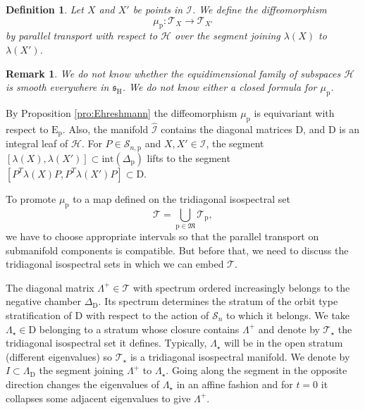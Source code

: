 \documentclass[reqno]{amsart}
\newcommand{\p}{\mathrm{p}}
\newcommand{\D}{\mathrm{D}}
\renewcommand{\ss}{\mathfrak{s}}
\newcommand{\cH}{\mathcal{H}}
\newcommand{\cI}{\mathcal{I}}
\newcommand{\cS}{\mathcal{S}}
\newcommand{\cT}{\mathcal{T}}
\newcommand{\E}{\mathrm{E}}
\renewcommand{\H}{\mathrm{H}}
\newtheorem{definition}[theorem]{Definition}
\newtheorem{remark}[theorem]{Remark}
\begin{document}
\begin{definition}\label{def:parallel-transport} Let $X$ and $X'$ be points in $\cI$. We define the diffeomorphism
 \begin{equation}\label{eq:parallel-transport}
  \mu_\p:\cT_X\to \cT_{X'}
 \end{equation}
by parallel transport with respect to $\cH$ over the segment joining $\lambda(X)$ to $\lambda(X')$.
\end{definition}
\begin{remark}\label{rem:Ehreshman2}
We do not know whether the equidimensional family of subspaces $\cH$ is smooth everywhere in $\ss_\H$. We do not know either a closed formula for $\mu_\p$.
\end{remark}

 By Proposition \ref{pro:Ehreshmann} the diffeomorphism $\mu_\p$ is equivariant with respect to $\E_{\p}$. Also, the manifold $\widehat{\cI}$ contains the diagonal matrices $\D$, and $\D$ is an integral leaf of $\cH$.  For $P\in \cS_{n,\p}$ and $X,X'\in \cI$,  the segment
 $[\lambda(X),\lambda(X')]\subset \mathrm{int}(\Delta_{\p})$ lifts to the segment $[P^T\lambda(X)P,P^T\lambda(X')P]\subset \D$.

To promote $\mu_\p$ to a map defined on the tridiagonal isospectral set
\[\cT=\bigcup_{\p\in \mathfrak{M}}\cT_\p,\]
we have to choose appropriate intervals so that the parallel transport on submanifold components is compatible.
But before that, we need to discuss   the tridiagonal isospectral sets in which we can embed $\cT$.

The diagonal matrix $\Lambda^+\in \cT$ with spectrum ordered increasingly belongs to the negative chamber $\Delta_\D$. Its spectrum determines the stratum of the orbit type stratification of $\D$ with respect to the action of $\cS_n$ to which it belongs. We take $\Lambda_\star\in \D$ belonging to a stratum whose closure contains $\Lambda^+$ and denote by $\cT_\star$ the tridiagonal isospectral set it defines. Typically, $\Lambda_\star$ will be in the open stratum (different eigenvalues) so $\cT_\star$ is a tridiagonal isospectral manifold. We denote by $I\subset \Lambda_\D$ the segment joining $\Lambda^+$ to $\Lambda_\star$. Going along the segment in the opposite direction changes the eigenvalues of $\Lambda_\star$ in an affine fashion and for $t=0$ it collapses some adjacent eigenvalues to give $\Lambda^+$.
\end{document}

